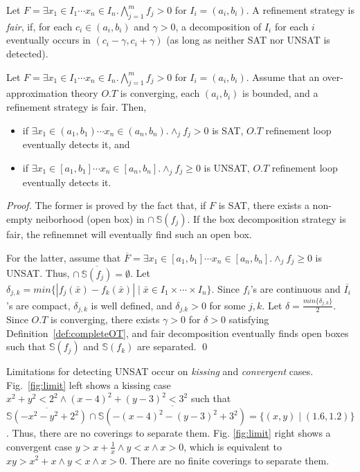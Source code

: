 \documentclass[runningheads,a4paper,oribibl]{llncs}
\begin{document}
\begin{definition} 
Let
$F = \exists x_1 \in I_1 \cdots x_n \in I_n. \bigwedge \limits_{j=1}^m f_j > 0$
for $I_i = (a_i,b_i)$.
A refinement strategy is {\em fair}, if, for each $c_i \in (a_i,b_i)$ and $\gamma > 0$, 
a decomposition of $I_i$ for each $i$ eventually occurs in $(c_i - \gamma, c_i + \gamma)$ 
(as long as neither SAT nor UNSAT is detected). 
\end{definition}

\begin{theorem} \label{th:RelComp}
Let
$F = \exists x_1 \in I_1 \cdots x_n \in I_n. \bigwedge \limits_{j=1}^m f_j > 0$
for $I_i = (a_i,b_i)$.
Assume that an over-approximation theory $O.T$ is converging, 
each $(a_i,b_i)$ is bounded, and a refinement strategy is fair. 
Then, 
\begin{itemize}
\item if $\exists x_1 \in (a_1,b_1) \cdots x_n \in (a_n,b_n) . \wedge_{j} f_j > 0$ is SAT, 
$O.T$ refinement loop eventually detects it, and
\item if $\exists x_1 \in [a_1,b_1] \cdots x_n \in [a_n,b_n] . \wedge_{j} f_j \geq 0$ is UNSAT, 
$O.T$ refinement loop eventually detects it.  
\end{itemize}
\end{theorem}


\begin{proof} 
The former is proved by the fact that, if $F$ is SAT, there exists a non-empty neiborhood (open box) 
in $\cap~\mathbb{S}(f_j)$. 
If the box decomposition strategy is fair, the refinemnet will eventually find such an open box. 

For the latter, assume that 
$\overline{F} = \exists x_1 \in [a_1,b_1] \cdots x_n \in [a_n,b_n] . \wedge_{j} f_j \geq 0$ is UNSAT. 
Thus, $\cap~\overline{\mathbb{S}(f_j)} = \emptyset$. 
Let $\delta_{j,k} = min \{|f_j(\bar{x}) - f_k(\bar{x})| \mid \bar{x} \in I_1 \times \cdots \times I_n\}$. 
Since $f_i$'s are continuous and $\overline{I_i}$'s are compact, $\delta_{j,k}$ is well defined,
and $\delta_{j.k} > 0$ for some $j,k$. 
Let $\delta = \frac{min \{ \delta_{j,k} \}}{2}$. 
Since $O.T$ is converging, there exists $\gamma > 0$ for $\delta > 0$ 
satisfying Definition~\ref{def:completeOT}, and fair decomposition eventually finds open boxes
such that $\mathbb{S}(f_j)$ and $\mathbb{S}(f_k)$ are separated. 
\qed
\end{proof}

Limitations for detecting UNSAT occur on \emph{kissing} and \emph{convergent} cases. 
Fig.~\ref{fig:limit} left shows a kissing case 
$x^2 + y^2 < 2^2 \wedge (x-4)^2 + (y-3)^2 < 3^2$ such that 
$\overline{\mathbb{S}(- x^2 - y^2 + 2^2)} \cap \overline{\mathbb{S}(- (x-4)^2 - (y-3)^2 + 3^2)} 
= \{(x,y) \mid (1.6, 1.2)\}$. 
Thus, there are no coverings to separate them. 
%
Fig. \ref{fig:limit} right shows a convergent case 
$y > x + \frac{1}{x} \wedge y < x \wedge x > 0$, which is equivalent to 
$xy > x^2 + x \wedge y < x \wedge x > 0$. 
There are no finite coverings to separate them. 
\end{document}
